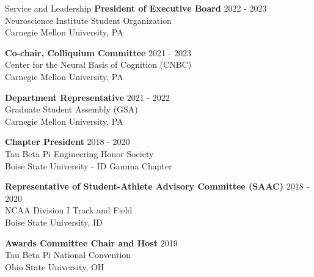 \documentclass{resume} %
\begin{document}
\begin{rSection}{Service and Leadership}
{\bf President of Executive Board} \hfill {2022 - 2023} \\ 
Neuroscience Institute Student Organization \\
Carnegie Mellon University, PA \smallskip 

{\bf Co-chair, Colliquium Committee} \hfill {2021 - 2023} \\ 
Center for the Neural Basis of Cognition (CNBC) \\
Carnegie Mellon University, PA \smallskip

{\bf Department Representative} \hfill {2021 - 2022} \\ 
Graduate Student Assembly (GSA) \\
Carnegie Mellon University, PA \smallskip

{\bf Chapter President} \hfill {2018 - 2020} \\ 
Tau Beta Pi Engineering Honor Society \\
Boise State University - ID Gamma Chapter \smallskip

{\bf Representative of Student-Athlete Advisory Committee (SAAC)} \hfill {2018 - 2020} \\ 
NCAA Division I Track and Field \\
Boise State University, ID \smallskip

{\bf Awards Committee Chair and Host} \hfill {2019} \\ 
Tau Beta Pi National Convention \\
Ohio State University, OH \smallskip

\end{rSection}
\end{document}
